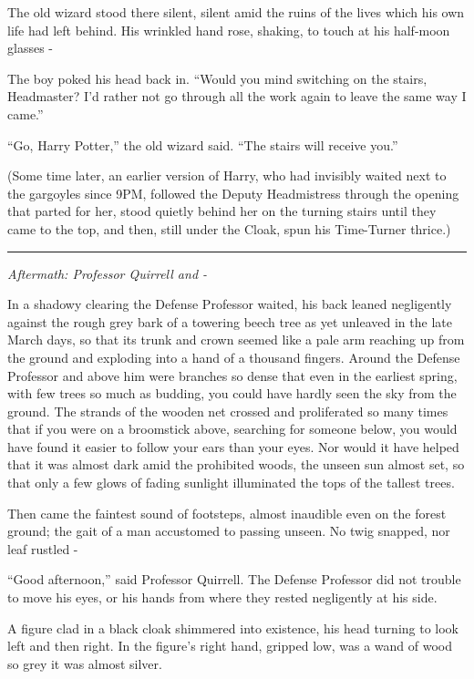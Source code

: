 The old wizard stood there silent, silent amid the ruins of the lives
which his own life had left behind. His wrinkled hand rose, shaking, to
touch at his half-moon glasses -

The boy poked his head back in. ``Would you mind switching on the
stairs, Headmaster? I'd rather not go through all the work again to
leave the same way I came.''

``Go, Harry Potter,'' the old wizard said. ``The stairs will receive
you.''

(Some time later, an earlier version of Harry, who had invisibly waited
next to the gargoyles since 9PM, followed the Deputy Headmistress
through the opening that parted for her, stood quietly behind her on the
turning stairs until they came to the top, and then, still under the
Cloak, spun his Time-Turner thrice.)

\begin{center}\rule{3in}{0.4pt}\end{center}

\emph{Aftermath: Professor Quirrell and -}

In a shadowy clearing the Defense Professor waited, his back leaned
negligently against the rough grey bark of a towering beech tree as yet
unleaved in the late March days, so that its trunk and crown seemed like
a pale arm reaching up from the ground and exploding into a hand of a
thousand fingers. Around the Defense Professor and above him were
branches so dense that even in the earliest spring, with few trees so
much as budding, you could have hardly seen the sky from the ground. The
strands of the wooden net crossed and proliferated so many times that if
you were on a broomstick above, searching for someone below, you would
have found it easier to follow your ears than your eyes. Nor would it
have helped that it was almost dark amid the prohibited woods, the
unseen sun almost set, so that only a few glows of fading sunlight
illuminated the tops of the tallest trees.

Then came the faintest sound of footsteps, almost inaudible even on the
forest ground; the gait of a man accustomed to passing unseen. No twig
snapped, nor leaf rustled -

``Good afternoon,'' said Professor Quirrell. The Defense Professor did
not trouble to move his eyes, or his hands from where they rested
negligently at his side.

A figure clad in a black cloak shimmered into existence, his head
turning to look left and then right. In the figure's right hand, gripped
low, was a wand of wood so grey it was almost silver.

